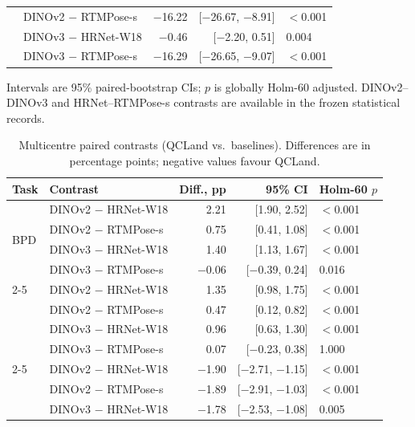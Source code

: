 \begin{table}[htbp]
\begin{tabular}{llrrl}
      & DINOv2 $-$ RTMPose-s   & $-$16.22 & [$-$26.67, $-$8.91] & $<$0.001 \\
      & DINOv3 $-$ HRNet-W18   & $-$0.46 & [$-$2.20, 0.51]    & 0.004 \\
      & DINOv3 $-$ RTMPose-s   & $-$16.29 & [$-$26.65, $-$9.07] & $<$0.001 \\
    \bottomrule
  \end{tabular}
  \par\smallskip
  {\footnotesize Intervals are 95\% paired-bootstrap CIs; $p$ is
    globally Holm-60 adjusted. DINOv2--DINOv3 and HRNet--RTMPose-s
    contrasts are available in the frozen statistical records.}
\end{table}

\begin{table}[htbp]
  \centering
  \caption{Multicentre paired contrasts (QCLand vs.\ baselines).
    Differences are in percentage points; negative values favour
    QCLand.}
  \label{tab:multicentre-paired}
  \footnotesize
  \setlength{\tabcolsep}{4pt}
  \renewcommand{\arraystretch}{0.92}
  \begin{tabular}{llrrl}
    \toprule
    Task & Contrast & Diff., pp & 95\% CI & Holm-60 $p$ \\
    \midrule
    \multirow{4}{*}{BPD}
      & DINOv2 $-$ HRNet-W18   & 2.21  & [1.90, 2.52]          & $<$0.001 \\
      & DINOv2 $-$ RTMPose-s   & 0.75  & [0.41, 1.08]          & $<$0.001 \\
      & DINOv3 $-$ HRNet-W18   & 1.40  & [1.13, 1.67]          & $<$0.001 \\
      & DINOv3 $-$ RTMPose-s   & $-$0.06 & [$-$0.39, 0.24]    & 0.016 \\
    \cmidrule(lr){2-5}
    \multirow{4}{*}{OFD}
      & DINOv2 $-$ HRNet-W18   & 1.35  & [0.98, 1.75]          & $<$0.001 \\
      & DINOv2 $-$ RTMPose-s   & 0.47  & [0.12, 0.82]          & $<$0.001 \\
      & DINOv3 $-$ HRNet-W18   & 0.96  & [0.63, 1.30]          & $<$0.001 \\
      & DINOv3 $-$ RTMPose-s   & 0.07  & [$-$0.23, 0.38]      & 1.000 \\
    \cmidrule(lr){2-5}
    \multirow{4}{*}{APAD}
      & DINOv2 $-$ HRNet-W18   & $-$1.90 & [$-$2.71, $-$1.15] & $<$0.001 \\
      & DINOv2 $-$ RTMPose-s   & $-$1.89 & [$-$2.91, $-$1.03] & $<$0.001 \\
      & DINOv3 $-$ HRNet-W18   & $-$1.78 & [$-$2.53, $-$1.08] & 0.005 \\

\end{tabular}
\end{table}
